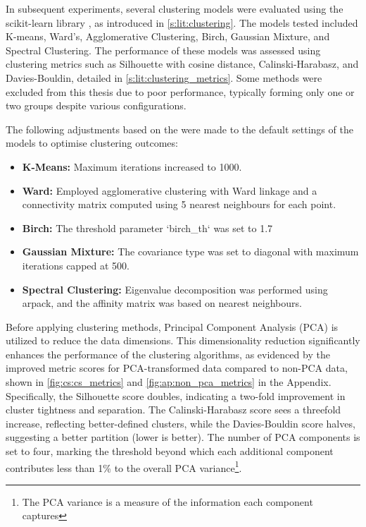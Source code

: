 In subsequent experiments, several clustering models were evaluated using the scikit-learn library \cite{Scikit-learn_undated-ax}, as introduced in \cref{s:lit:clustering}. The models tested included K-means, Ward’s, Agglomerative Clustering, Birch, Gaussian Mixture, and Spectral Clustering. The performance of these models was assessed using clustering metrics such as Silhouette with cosine distance, Calinski-Harabasz, and Davies-Bouldin, detailed in \cref{s:lit:clustering_metrics}. Some methods were excluded from this thesis due to poor performance, typically forming only one or two groups despite various configurations.

The following adjustments based on the \citet{Scikit-learn_undated-ax} were made to the default settings of the models to optimise clustering outcomes:
\begin{itemize}
    \item \textbf{K-Means:} Maximum iterations increased to 1000.
    \item \textbf{Ward:} Employed agglomerative clustering with Ward linkage and a connectivity matrix computed using 5 nearest neighbours for each point.
    \item \textbf{Birch:} The threshold parameter `birch\_th` was set to 1.7
    \item \textbf{Gaussian Mixture:} The covariance type was set to diagonal with maximum iterations capped at 500.
    \item \textbf{Spectral Clustering:} Eigenvalue decomposition was performed using arpack, and the affinity matrix was based on nearest neighbours.
\end{itemize}


Before applying clustering methods, Principal Component Analysis (PCA) is utilized to reduce the data dimensions. This dimensionality reduction significantly enhances the performance of the clustering algorithms, as evidenced by the improved metric scores for PCA-transformed data compared to non-PCA data, shown in \cref{fig:cs:cs_metrics} and \cref{fig:ap:non_pca_metrics} in the Appendix. Specifically, the Silhouette score doubles, indicating a two-fold improvement in cluster tightness and separation. The Calinski-Harabasz score sees a threefold increase, reflecting better-defined clusters, while the Davies-Bouldin score halves, suggesting a better partition (lower is better). The number of PCA components is set to four, marking the threshold beyond which each additional component contributes less than 1\% to the overall PCA variance\footnote{The PCA variance is a measure of the information each component captures}.

